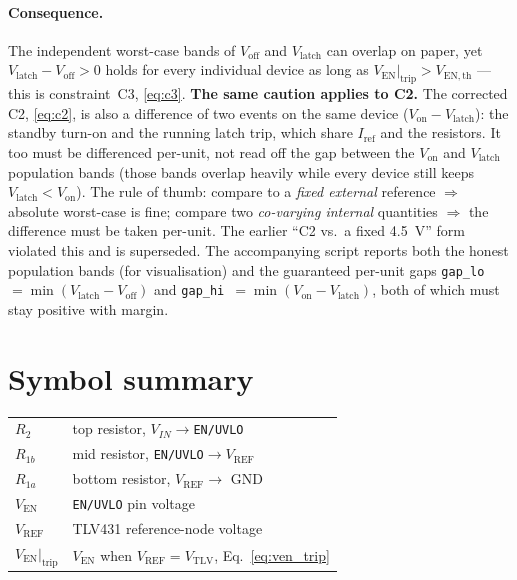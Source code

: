 \documentclass[11pt]{article}
\newcommand{\Ven}{V_{\mathrm{EN}}}
\newcommand{\Vref}{V_{\mathrm{REF}}}
\newcommand{\Vtlv}{V_{\mathrm{TLV}}}
\newcommand{\Vth}{V_{\mathrm{EN,th}}}
\newcommand{\Iref}{I_{\mathrm{ref}}}
\newcommand{\Rone}{R_{1a}}
\newcommand{\Rtwo}{R_{1b}}
\newcommand{\Rt}{R_{2}}
\begin{document}
\paragraph{Consequence.} The independent worst-case bands of $V_{\mathrm{off}}$ and
$V_{\mathrm{latch}}$ can overlap on paper, yet $V_{\mathrm{latch}}-V_{\mathrm{off}}>0$
holds for every individual device as long as $\Ven|_{\mathrm{trip}}>\Vth$ --- this is
constraint~C3, \eqref{eq:c3}. \textbf{The same caution applies to C2.} The corrected C2,
\eqref{eq:c2}, is also a difference of two events on the same device
($V_{\mathrm{on}}-V_{\mathrm{latch}}$): the standby turn-on and the running latch trip,
which share $\Iref$ and the resistors. It too must be differenced per-unit, not read off
the gap between the $V_{\mathrm{on}}$ and $V_{\mathrm{latch}}$ population bands (those bands
overlap heavily while every device still keeps $V_{\mathrm{latch}}<V_{\mathrm{on}}$). The
rule of thumb: compare to a \emph{fixed external} reference $\Rightarrow$ absolute
worst-case is fine; compare two \emph{co-varying internal} quantities $\Rightarrow$ the
difference must be taken per-unit. The earlier ``C2 vs.\ a fixed \SI{4.5}{\volt}'' form
violated this and is superseded. The accompanying script reports both the honest
population bands (for visualisation) and the guaranteed per-unit gaps
\texttt{gap\_lo}~$=\min(V_{\mathrm{latch}}-V_{\mathrm{off}})$ and
\texttt{gap\_hi}~$=\min(V_{\mathrm{on}}-V_{\mathrm{latch}})$, both of which must stay
positive with margin.

\section{Symbol summary}
\begin{center}
\begin{tabular}{ll}
\toprule
$\Rt$ & top resistor, $V_{IN}\to$\texttt{EN/UVLO} \\
$\Rtwo$ & mid resistor, \texttt{EN/UVLO}$\to\Vref$ \\
$\Rone$ & bottom resistor, $\Vref\to$ GND \\
$\Ven$ & \texttt{EN/UVLO} pin voltage \\
$\Vref$ & TLV431 reference-node voltage \\
$\Ven|_{\mathrm{trip}}$ & $\Ven$ when $\Vref=\Vtlv$, Eq.~\eqref{eq:ven_trip} \\
\bottomrule
\end{tabular}
\end{center}
\end{document}
